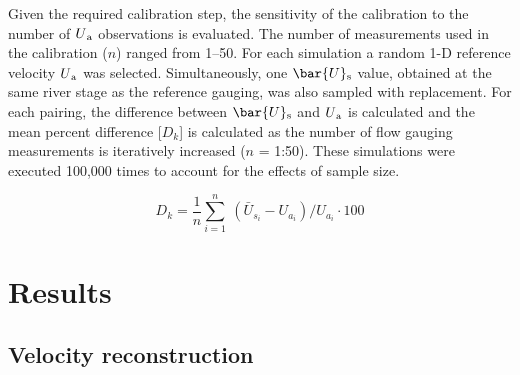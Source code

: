 \documentclass[hess, manuscript]{copernicus}
\begin{document}
Given the required calibration step, the sensitivity of the calibration to the number of $U\textsubscript{a}$ observations is evaluated. The number of measurements used in the calibration ($n$) ranged from 1--50. For each simulation a random 1-D reference velocity $U\textsubscript{a}$ was selected. Simultaneously, one $\bar{U}\textsubscript{s}$ value, obtained at the same river stage as the reference gauging, was also sampled with replacement. For each pairing, the difference between $\bar{U}\textsubscript{s}$ and $U\textsubscript{a}$ is calculated and the mean percent difference [${D_k}$] is calculated as the number of flow gauging measurements is iteratively increased ($n$ = 1:50). These simulations were executed 100,000 times to account for the effects of sample size.

\begin{equation}
{D_k} = \frac{1}{n} \sum_{i=1}^{n} \ (\bar{U}_{s_i} - U_{a_i}) / U_{a_i}  \cdot 100
\label{eqn: Equation 5}
\end{equation}





\section{Results}

\subsection{Velocity reconstruction}
\end{document}
